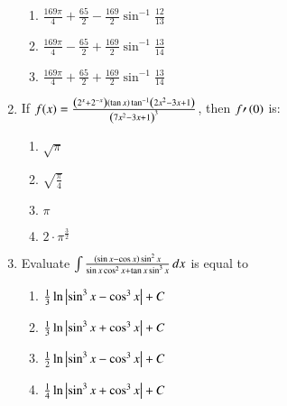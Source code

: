 \documentclass[journal,12pt,twocolumn]{IEEEtran}
\theoremstyle{remark}
\begin{document}
\begin{enumerate}[start=1]
\begin{enumerate}
    \item $\frac{169 \pi}{4} + \frac{65}{2} - \frac{169}{2} \sin^{-1} \frac{12}{13}$
    \item $\frac{169 \pi}{4} - \frac{65}{2} + \frac{169}{2} \sin^{-1} \frac{13}{14}$
    \item $\frac{169 \pi}{4} + \frac{65}{2} + \frac{169}{2} \sin^{-1} \frac{13}{14}$
\end{enumerate}
\item If $f(x) = \frac{\left(2^x +2^{-x}\right)\left(\tan x\right)\tan^{-1} \left(2x^2 - 3x + 1\right)}{\left(7x^2 - 3x +1\right)^3}$, then $f\prime\left(0\right)$ is:
\begin{enumerate}
    \item $\sqrt{\pi}$
    \item $\sqrt{\frac{\pi}{4}}$
    \item $\pi$
    \item $2\cdot\pi^\frac{3}{2}$
\end{enumerate}
\item Evaluate $\int \frac{\left(\sin x - \cos x\right) \sin^2 x}{\sin x\cos^2 x + \tan x\sin^3 x} \, dx$ is equal to
\begin{enumerate}
    \item $\frac{1}{3} \ln \left\vert\sin^3 x - \cos^3 x\right\vert + C$
    \item $\frac{1}{3} \ln \left\vert\sin^3 x + \cos^3 x\right\vert + C$
    \item $\frac{1}{2} \ln \left\vert\sin^3 x - \cos^3 x\right\vert + C$
    \item $\frac{1}{4} \ln \left\vert\sin^3 x + \cos^3 x\right\vert + C$
\end{enumerate}
\end{enumerate}
\end{document}
